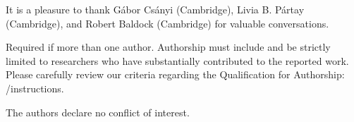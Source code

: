 \documentclass[journal,article,accept,moreauthors,pdftex,12pt,a4paper]{mdpi}
\begin{document}

It is a pleasure to thank Gábor Csányi (Cambridge), Livia B. Pártay (Cambridge),
and Robert Baldock (Cambridge) for valuable conversations.



Required if more than one author. Authorship must include and be strictly limited to researchers who have substantially contributed to the reported work. Please carefully review our criteria regarding the Qualification for Authorship: \web /instructions.


The authors declare no conflict of interest.


\makeatletter
\renewcommand\@biblabel[1]{#1. }
\makeatother
\end{document}

